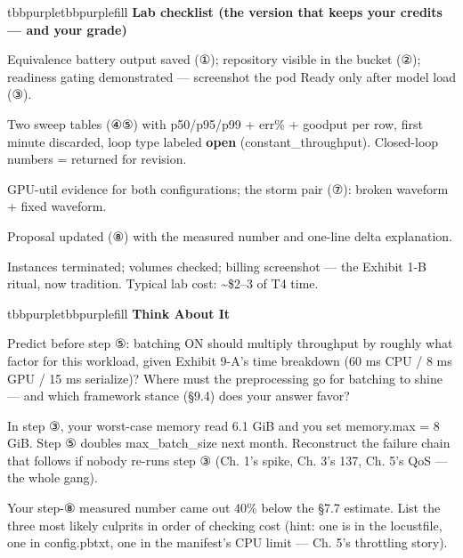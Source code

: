 \begin{calloutbox}{tbbpurple}{tbbpurplefill}
{\normalsize\bfseries\color{tbbpurple}Lab checklist (the version that keeps your credits — and your grade)}\par\vspace{3pt}
\begin{tbbitemize}
  \item Equivalence battery output saved (①); repository visible in the bucket (②); readiness gating demonstrated — screenshot the pod Ready only after model load (③).
  \item Two sweep tables (④⑤) with p50/p95/p99 + err\% + goodput per row, first minute discarded, loop type labeled \textbf{open} (constant\_throughput). Closed-loop numbers = returned for revision.
  \item GPU-util evidence for both configurations; the storm pair (⑦): broken waveform + fixed waveform.
  \item Proposal updated (⑧) with the measured number and one-line delta explanation.
  \item Instances terminated; volumes checked; billing screenshot — the Exhibit 1-B ritual, now tradition. Typical lab cost: \textasciitilde{}\$2–3 of T4 time.
\end{tbbitemize}
\end{calloutbox}

\vspace{3.0pt}

\begin{calloutbox}{tbbpurple}{tbbpurplefill}
{\normalsize\bfseries\color{tbbpurple}Think About It}\par\vspace{3pt}
\begin{tbbitemize}
  \item Predict before step ⑤: batching ON should multiply throughput by roughly what factor for this workload, given Exhibit 9-A's time breakdown (60 ms CPU / 8 ms GPU / 15 ms serialize)? Where must the preprocessing go for batching to shine — and which framework stance (§9.4) does your answer favor?
  \item In step ③, your worst-case memory read 6.1 GiB and you set memory.max = 8 GiB. Step ⑤ doubles max\_batch\_size next month. Reconstruct the failure chain that follows if nobody re-runs step ③ (Ch. 1's spike, Ch. 3's 137, Ch. 5's QoS — the whole gang).
  \item Your step-⑧ measured number came out 40\% below the §7.7 estimate. List the three most likely culprits in order of checking cost (hint: one is in the locustfile, one in config.pbtxt, one in the manifest's CPU limit — Ch. 5's throttling story).
\end{tbbitemize}
\end{calloutbox}

